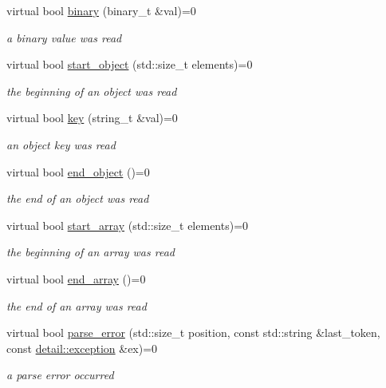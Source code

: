 \begin{DoxyCompactItemize}
virtual bool \hyperlink{structnlohmann_1_1json__sax_a38c2dbde07138cc436ea7fbf22c1e92d}{binary} (binary\+\_\+t \&val)=0
\begin{DoxyCompactList}\small\item\em a binary value was read \end{DoxyCompactList}\item 
virtual bool \hyperlink{structnlohmann_1_1json__sax_a0671528b0debb5a348169d61f0382a0f}{start\+\_\+object} (std\+::size\+\_\+t elements)=0
\begin{DoxyCompactList}\small\item\em the beginning of an object was read \end{DoxyCompactList}\item 
virtual bool \hyperlink{structnlohmann_1_1json__sax_a2e0c7ecd80b18d18a8cc76f71cfc2028}{key} (string\+\_\+t \&val)=0
\begin{DoxyCompactList}\small\item\em an object key was read \end{DoxyCompactList}\item 
virtual bool \hyperlink{structnlohmann_1_1json__sax_ad0c722d53ff97be700ccf6a9468bd456}{end\+\_\+object} ()=0
\begin{DoxyCompactList}\small\item\em the end of an object was read \end{DoxyCompactList}\item 
virtual bool \hyperlink{structnlohmann_1_1json__sax_a5c53878cf08d463eb4e7ca0270532572}{start\+\_\+array} (std\+::size\+\_\+t elements)=0
\begin{DoxyCompactList}\small\item\em the beginning of an array was read \end{DoxyCompactList}\item 
virtual bool \hyperlink{structnlohmann_1_1json__sax_a235ee975617f28e6a996d1e36a282312}{end\+\_\+array} ()=0
\begin{DoxyCompactList}\small\item\em the end of an array was read \end{DoxyCompactList}\item 
virtual bool \hyperlink{structnlohmann_1_1json__sax_a60287e3bd85f489e04c83f7e3b76e613}{parse\+\_\+error} (std\+::size\+\_\+t position, const std\+::string \&last\+\_\+token, const \hyperlink{classnlohmann_1_1detail_1_1exception}{detail\+::exception} \&ex)=0
\begin{DoxyCompactList}\small\item\em a parse error occurred \end{DoxyCompactList}\item 

\end{DoxyCompactItemize}
